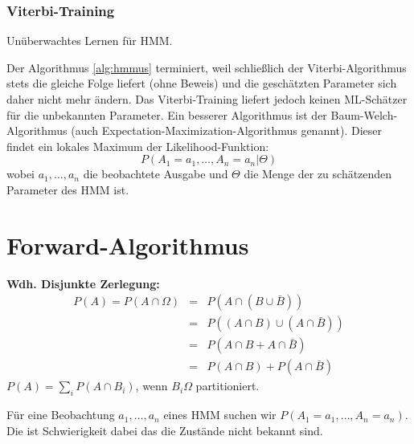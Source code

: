 \subsubsection{Viterbi-Training}
\begin{algorithm}
	\begin{algorithmic}[1]
		\Repeat
	\end{algorithmic}
	\caption{Unüberwachtes Lernen für HMM.}
	\label{alg:hmmus}
\end{algorithm}
Der Algorithmus \ref{alg:hmmus} terminiert, weil schließlich der Viterbi-Algorithmus stets die gleiche Folge liefert (ohne Beweis) und die geschätzten Parameter sich daher nicht mehr ändern.
Das Viterbi-Training liefert jedoch keinen ML-Schätzer für die unbekannten Parameter.
Ein besserer Algorithmus ist der Baum-Welch-Algorithmus (auch Ex\-pect\-ation-Maximization-Algorithmus genannt).
Dieser findet ein lokales Maximum der Likelihood-Funktion:
	\[P(A_1=a_1, \dots, A_n=a_n|\Theta)\]
wobei \(a_1, \dots, a_n\) die beobachtete Ausgabe und \(\Theta\) die Menge der zu schätzenden Parameter des HMM ist.

\section{Forward-Algorithmus}
\begin{shaded}
	\noindent
	\textbf{Wdh. Disjunkte Zerlegung:}
	\begin{eqnarray*}
		P(A) = P(A \cap \Omega) &=& P(A \cap (B \cup \bar{B}))\\
								&=& P((A \cap B) \cup (A \cap \bar{B}))\\
								&=& P(A \cap B + A \cap \bar{B})\\
								&=& P(A \cap B)+P(A \cap \bar{B})
	\end{eqnarray*}
	\(P(A) = \sum_i P(A \cap B_i)\), wenn \(B_i \Omega\) partitioniert.
	\begin{center}
	\end{center}
\end{shaded}
Für eine Beobachtung \(a_1, \dots, a_n\) eines HMM suchen wir \(P(A_1=a_1, \dots, A_n=a_n)\).
Die ist Schwierigkeit dabei das die Zustände nicht bekannt sind.

